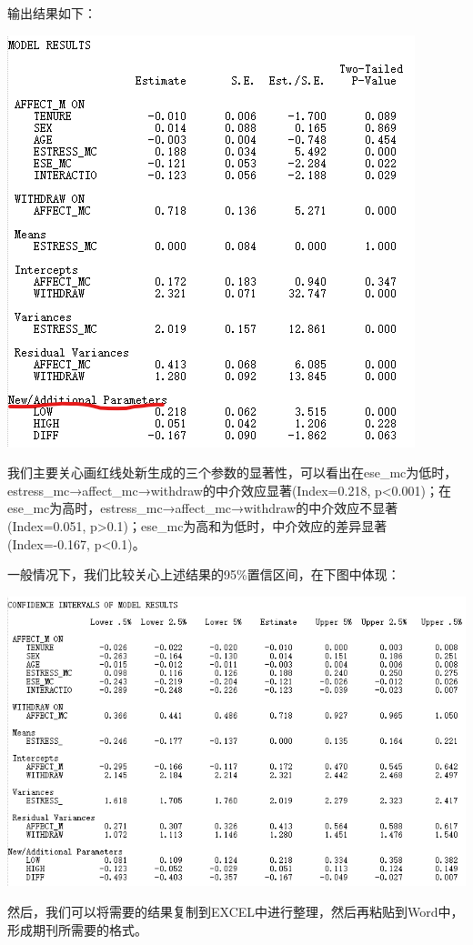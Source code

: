 \documentclass[
]{book}
\begin{document}
输出结果如下：

\includegraphics{figs/1143.png}

我们主要关心画红线处新生成的三个参数的显著性，可以看出在ese\_mc为低时，estress\_mc→affect\_mc→withdraw的中介效应显著(Index=0.218, p\textless0.001)；在ese\_mc为高时，estress\_mc→affect\_mc→withdraw的中介效应不显著(Index=0.051, p\textgreater0.1)；ese\_mc为高和为低时，中介效应的差异显著(Index=-0.167, p\textless0.1)。

一般情况下，我们比较关心上述结果的95\%置信区间，在下图中体现：

\includegraphics{figs/1144.png}

然后，我们可以将需要的结果复制到EXCEL中进行整理，然后再粘贴到Word中，形成期刊所需要的格式。
\end{document}
